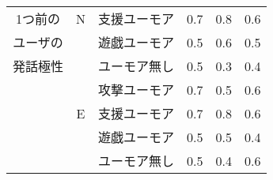 \begin{table}
\begin{center}
\begin{tabular}{|c|c|c|p{6em}|p{6em}|p{6em}|}
1つ前の & N & 支援ユーモア & \hspace{2.4zw}0.7 & \hspace{2.4zw}0.8 & \hspace{2.4zw}0.6 \\\cline{3-6}
ユーザの&  & 遊戯ユーモア & \hspace{2.4zw}0.5 & \hspace{2.4zw}0.6 & \hspace{2.4zw}0.5 \\\cline{3-6}
発話極性 &  & ユーモア無し & \hspace{2.4zw}0.5 & \hspace{2.4zw}0.3 & \hspace{2.4zw}0.4 \\\cline{2-6}
 &  & 攻撃ユーモア & \hspace{2.4zw}0.7 & \hspace{2.4zw}0.5 & \hspace{2.4zw}0.6 \\\cline{3-6}
 & E & 支援ユーモア & \hspace{2.4zw}0.7 & \hspace{2.4zw}0.8 & \hspace{2.4zw}0.6 \\\cline{3-6}
 &  & 遊戯ユーモア & \hspace{2.4zw}0.5 & \hspace{2.4zw}0.5 & \hspace{2.4zw}0.4 \\\cline{3-6}
 &  & ユーモア無し & \hspace{2.4zw}0.5 & \hspace{2.4zw}0.4 & \hspace{2.4zw}0.6 \\\hline
\end{tabular}
\end{center}
\end{table}


